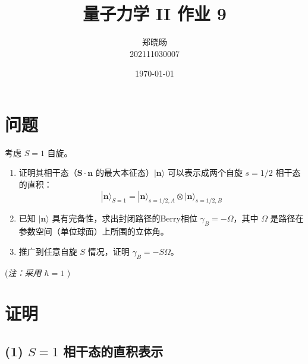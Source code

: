 \documentclass[12pt, a4paper]{article}
\title{量子力学 II 作业 9}
\author{郑晓旸 \\ 202111030007} %
\date{\today}
\newcommand{\ket}[1]{| #1 \rangle}
\newcommand{\nvec}{\mathbf{n}}
\newcommand{\Svec}{\mathbf{S}}
\begin{document}
\maketitle

\section*{问题}
考虑 \(S=1\) 自旋。
\begin{enumerate}
    \item 证明其相干态（\(\Svec \cdot \nvec\) 的最大本征态）\(\ket{\nvec}\) 可以表示成两个自旋 \(s=1/2\) 相干态的直积：
    \[ \ket{\nvec}_{S=1} = \ket{\nvec}_{s=1/2, A} \otimes \ket{\nvec}_{s=1/2, B} \]
    \item 已知 \(\ket{\nvec}\) 具有完备性，求出封闭路径的Berry相位 \(\gamma_B = -\Omega\)，其中 \(\Omega\) 是路径在参数空间（单位球面）上所围的立体角。
    \item 推广到任意自旋 \(S\) 情况，证明 \(\gamma_B = -S\Omega\)。
\end{enumerate}
(\textit{注：采用 \(\hbar=1\) })

\section*{证明}

\subsection*{(1) \(S=1\) 相干态的直积表示}
\end{document}
